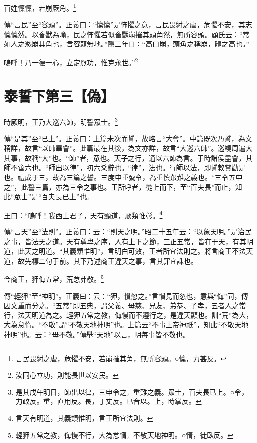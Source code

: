 百姓懍懍，若崩厥角。\footnote{言民畏紂之虐，危懼不安，若崩摧其角，無所容頭。○懍，力甚反。}

{\noindent\zhuan{}\fzbyks 傳“言民”至“容頭”。正義曰：“懍懍”是怖懼之意，言民畏紂之虐，危懼不安，其志懍懍然。以畜獸為喻，民之怖懼若似畜獸崩摧其頭角然，無所容頭。顧氏云：“常如人之慾崩其角也，言容頭無地。”隱三年曰：“高曰崩，頭角之稱崩，體之高也。” \par}

嗚呼！乃一德一心，立定厥功，惟克永世。”\footnote{汝同心立功，則能長世以安民。}

\section{泰誓下第三【偽】}


時厥明，王乃大巡六師，明誓眾士。\footnote{是其戊午明日，師出以律，三申令之，重難之義。眾士，百夫長已上。○令，力政反。重，直用反。長，丁丈反。已音以。上，時掌反。}

{\noindent\zhuan{}\fzbyks 傳“是其”至“已上”。正義曰：上篇未次而誓，故略言“大會”。中篇既次乃誓，為文稍詳，故言“以師畢會”。此篇最在其後，為文亦詳，故言“大巡六師”。巡繞周遍大其事，故稱“大”也。“師”者，眾也。天子之行，通以六師為言。于時諸侯盡會，其師不啻六也。“師出以律”，初六爻辭也。“律”，法也。行師以法，即誓敕賞勸是也。禮成于三，故為三篇之誓。三度申重號令，為重慎艱難之義也。“三令五申之”，此誓三篇，亦為三令之事也。王所呼者，從上而下，至“百夫長”而止，知此“眾士”是“百夫長已上”也。 \par}

王曰：“嗚呼！我西土君子，天有顯道，厥類惟彰。\footnote{言天有明道，其義類惟明，言王所宜法則。}

{\noindent\zhuan{}\fzbyks 傳“言天”至“法則”。正義曰：云：“則天之明。”昭二十五年云：“以象天明。”是治民之事，皆法天之道。天有尊卑之序，人有上下之節，三正五常，皆在于天，有其明道，此天之明道。“其義類惟明”，言明白可效，王者所宜法則之。將言商王不法天道，故先標二句于前。其下乃述商王違天之事，言其罪宜誅也。 \par}

今商王，狎侮五常，荒怠弗敬。\footnote{輕狎五常之教，侮慢不行，大為怠惰，不敬天地神明。○惰，徒臥反。}

{\noindent\zhuan{}\fzbyks 傳“輕狎”至“神明”。正義曰：云：“狎，慣忽之。”言慣見而忽也，意與“侮”同，傳因文重而分之。“五常”即五典，謂父義、母慈、兄友、弟恭、子孝，五者人之常行，法天明道為之。輕狎五常之教，侮慢而不遵行之，是違天顯也。訓“荒”為大，大為怠惰。“不敬”謂“不敬天地神明”也。上篇云“不事上帝神祇”，知此“不敬天地神明”也。云：“毋不敬。”傳舉“天地”以言，明每事皆不敬也。 \par}

